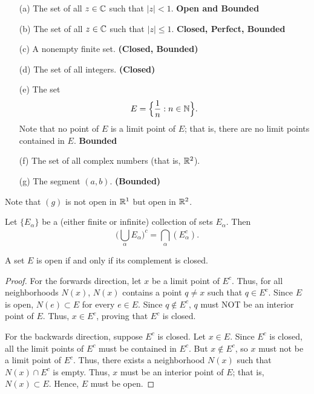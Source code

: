 \documentclass[11pt,a4paper]{book}
\begin{document}
\begin{eg}
   \begin{enumerate}
       \item[(a)] The set of all \( z \in \mathbb{C}  \) such that \( | z  |  < 1  \). \textbf{Open and Bounded}
        \item[(b)] The set of all \( z \in \mathbb{C}  \) such that \( | z  |  \leq 1  \). \textbf{Closed, Perfect, Bounded}  
        \item[(c)] A nonempty finite set. \textbf{(Closed, Bounded)}
        \item[(d)] The set of all integers. \textbf{(Closed)}
        \item[(e)] The set 
            \[ E =  \Big\{ \frac{ 1 }{ n } : n \in \mathbb{N}  \Big\}.  \]
            Note that no point of \( E  \) is a limit point of \( E  \); that is, there are no limit points contained in \( E  \). \textbf{Bounded}
        \item[(f)] The set of all complex numbers (that is, \( \mathbb{R}^{2} \)).
        \item[(g)] The segment \( (a,b) \). \textbf{(Bounded)}
   \end{enumerate}  
\end{eg}

Note that \( (g) \) is not open in \( \mathbb{R}^{1} \) but open in \( \mathbb{R}^{2} \).

\begin{theorem}[ ]
    Let \( \{ {E}_{\alpha} \}  \) be a (either finite or infinite) collection of sets \( {E}_{\alpha} \). Then
    \[  \Big(  \bigcup_{ \alpha } {E}_{\alpha}  \Big)^{c} = \bigcap_{ \alpha }^{  } ({E}_{\alpha}^{c}). \]
\end{theorem}

\begin{theorem}[ ]
    A set \( E  \) is open if and only if its complement is closed.
\end{theorem}
\begin{proof}
    For the forwards direction, let \( x  \) be a limit point of \( E^{c} \). Thus, for all neighborhoods \( N(x) \), \( N(x)  \) contains a point \( q \neq x  \) such that \( q \in E^{c}  \). Since \( E  \) is open, \( N(e) \subset E  \) for every \( e \in E  \). Since \( q \notin E^{c} \), \( q  \) must NOT be an interior point of \( E  \). Thus, \( x \in E^{c} \), proving that \( E^{c} \) is closed. 

   For the backwards direction, suppose \( E^{c} \) is closed. Let \( x \in E  \). Since \( E^{c} \) is closed, all the limit points of \( E^{c} \) must be contained in \( E^{c} \). But \( x \notin E^{c} \), so \( x  \) must not be a limit point of \( E^{c} \). Thus, there exists a neighborhood \( N(x)  \) such that \( N(x) \cap E^{c}  \) is empty. Thus, \( x  \) must be an interior point of \( E  \); that is, \( N(x) \subset E  \). Hence, \( E  \) must be open.  
\end{proof}
\end{document}
